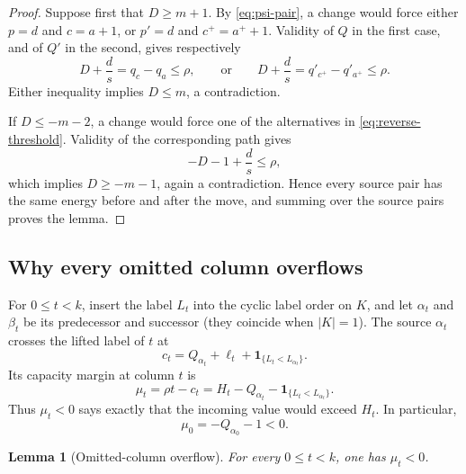 \documentclass[10pt]{article}
\newtheorem{lemma}{Lemma}[section]
\newcommand{\ind}{\mathbf 1}
\begin{document}
\begin{proof}
Suppose first that \(D\ge m+1\).  By \eqref{eq:psi-pair}, a change would
force either \(p=d\) and \(c=a+1\), or \(p'=d\) and
\(c^+=a^++1\).  Validity of \(Q\) in the first case, and of \(Q'\) in the
second, gives respectively
\[
  D+\frac ds=q_c-q_a\le\rho,
  \qquad\text{or}\qquad
  D+\frac ds=q'_{c^+}-q'_{a^+}\le\rho.
\]
Either inequality implies \(D\le m\), a contradiction.

If \(D\le-m-2\), a change would force one of the alternatives in
\eqref{eq:reverse-threshold}.  Validity of the corresponding path gives
\[
  -D-1+\frac ds\le\rho,
\]
which implies \(D\ge-m-1\), again a contradiction.  Hence every source
pair has the same energy before and after the move, and summing over the
source pairs proves the lemma.
\end{proof}

\subsection{Why every omitted column overflows}

For \(0\le t<k\), insert the label \(L_t\) into the cyclic label order on
\(K\), and let \(\alpha_t\) and \(\beta_t\) be its predecessor and successor
(they coincide when \(|K|=1\)).  The source \(\alpha_t\) crosses the lifted
label of \(t\) at
\[
  c_t=Q_{\alpha_t}+\ell_t+
      \ind_{\{L_t<L_{\alpha_t}\}}.
\]
Its capacity margin at column \(t\) is
\begin{equation}
  \mu_t=\rho t-c_t
  =H_t-Q_{\alpha_t}-\ind_{\{L_t<L_{\alpha_t}\}}.
  \label{eq:mu-def}
\end{equation}
Thus \(\mu_t<0\) says exactly that the incoming value would exceed \(H_t\).
In particular,
\begin{equation}
  \mu_0=-Q_{\alpha_0}-1<0.
  \label{eq:mu-zero}
\end{equation}

\begin{lemma}[Omitted-column overflow]
\label{lem:overflow}
For every \(0\le t<k\), one has \(\mu_t<0\).
\end{lemma}
\end{document}
